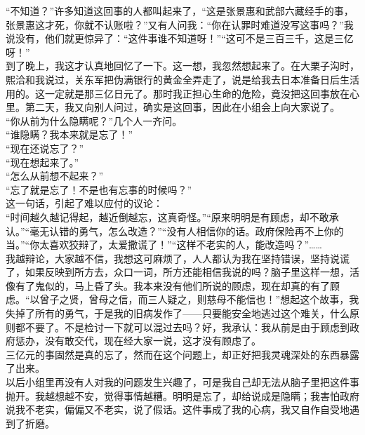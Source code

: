 “不知道？”许多知道这回事的人都叫起来了，“这是张景惠和武部六藏经手的事，张景惠这才死，你就不认账啦？”又有人问我：“你在认罪时难道没写这事吗？”我说没有，他们就更惊异了：“这件事谁不知道呀！”“这可不是三百三千，这是三亿呀！”\\

到了晚上，我这才认真地回忆了一下。这一想，我忽然想起来了。在大栗子沟时，熙洽和我说过，关东军把伪满银行的黄金全弄走了，说是给我去日本准备日后生活用的。这一定就是那三亿日元了。那时我正担心生命的危险，竟没把这回事放在心里。第二天，我又向别人问过，确实是这回事，因此在小组会上向大家说了。\\

“你从前为什么隐瞒呢？”几个人一齐问。\\

“谁隐瞒？我本来就是忘了！”\\

“现在还说忘了？”\\

“现在想起来了。”\\

“怎么从前想不起来？”\\

“忘了就是忘了！不是也有忘事的时候吗？”\\

这一句话，引起了难以应付的议论：\\

“时间越久越记得起，越近倒越忘，这真奇怪。”“原来明明是有顾虑，却不敢承认。”“毫无认错的勇气，怎么改造？”“没有人相信你的话。政府保险再不上你的当。”“你太喜欢狡辩了，太爱撒谎了！”“这样不老实的人，能改造吗？”……\\

我越辩论，大家越不信，我想这可麻烦了，人人都认为我在坚持错误，坚持说谎了，如果反映到所方去，众口一词，所方还能相信我说的吗？脑子里这样一想，活像有了鬼似的，马上昏了头。我本来没有他们所说的顾虑，现在却真的有了顾虑。“以曾子之贤，曾母之信，而三人疑之，则慈母不能信也！”想起这个故事，我失掉了所有的勇气，于是我的旧病发作了——只要能安全地逃过这个难关，什么原则都不要了。不是检讨一下就可以混过去吗？好，我承认：我从前是由于顾虑到政府惩办，没有敢交代，现在经大家一说，这才没有顾虑了。\\

三亿元的事固然是真的忘了，然而在这个问题上，却正好把我灵魂深处的东西暴露了出来。\\

以后小组里再没有人对我的问题发生兴趣了，可是我自己却无法从脑子里把这件事抛开。我越想越不安，觉得事情越糟。明明是忘了，却给说成是隐瞒；我害怕政府说我不老实，偏偏又不老实，说了假话。这件事成了我的心病，我又自作自受地遇到了折磨。\\

